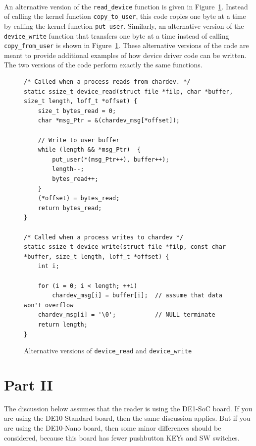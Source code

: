\documentclass[epsfig,10pt,fullpage]{article}
\begin{document}
~\\
\noindent
An alternative version of the \texttt{read\_device} function is given in 
Figure~\ref{fig:alternate}. Instead of calling the kernel function
\texttt{copy\_to\_user}, this code copies one byte at a time by calling the kernel function
\texttt{put\_user}. Similarly, an alternative version of the \texttt{device\_write}
function that transfers one byte at a time instead of calling \texttt{copy\_from\_user}
is shown in Figure~\ref{fig:alternate}.  These alternative versions of the code 
are meant to provide additional examples of how device driver code can be written. The two
versions of the code perform exactly the same functions.

\lstset{language=C}
\begin{figure}[H]
\begin{center}
\begin{minipage}[t]{15 cm}
\begin{lstlisting}[name=alternate]
/* Called when a process reads from chardev. */
static ssize_t device_read(struct file *filp, char *buffer, size_t length, loff_t *offset) {
    size_t bytes_read = 0;
    char *msg_Ptr = &(chardev_msg[*offset]);
    
    // Write to user buffer
    while (length && *msg_Ptr)  {
        put_user(*(msg_Ptr++), buffer++);
        length--;
        bytes_read++;
    }
    (*offset) = bytes_read;
    return bytes_read;
}

/* Called when a process writes to chardev */
static ssize_t device_write(struct file *filp, const char *buffer, size_t length, loff_t *offset) {
    int i;

    for (i = 0; i < length; ++i)
        chardev_msg[i] = buffer[i];  // assume that data won't overflow
    chardev_msg[i] = '\0';           // NULL terminate
    return length;
}
\end{lstlisting}
\end{minipage}
\caption{Alternative versions of \texttt{device\_read} and \texttt{device\_write}}
\label{fig:alternate}
\end{center}
\end{figure}

\vspace{-1cm}
\section*{Part II}
\noindent
The discussion below assumes that the reader is using the DE1-SoC board. If you are using
the DE10-Standard board, then the same discussion applies. But if you are using the
DE10-Nano board, then some minor differences should be considered, because this 
board has fewer pushbutton KEYs and SW switches. 
\end{document}
